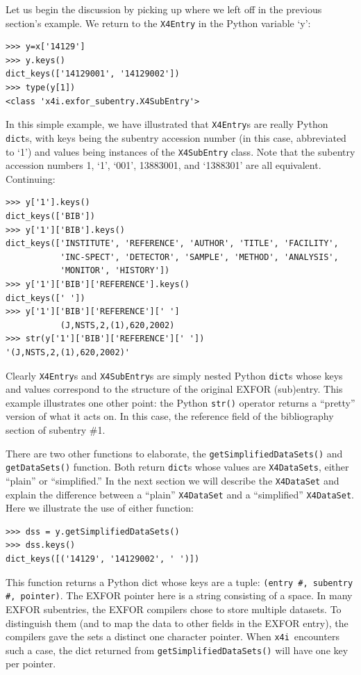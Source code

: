\documentclass[11pt]{article}
\newcommand{\xfouri}{\texttt{x4i}}
\begin{document}
Let us begin the discussion by picking up where we left off in the previous section's example.  We return to the \texttt{X4Entry} in the Python variable `y':
\begin{verbatim}
>>> y=x['14129']
>>> y.keys()
dict_keys(['14129001', '14129002'])
>>> type(y[1])
<class 'x4i.exfor_subentry.X4SubEntry'>
\end{verbatim}
In this simple example, we have illustrated that \texttt{X4Entry}s are really Python \texttt{dict}s, with keys  being the subentry accession number (in this case, abbreviated to `1') and values being instances of the \texttt{X4SubEntry} class.  Note that the subentry accession numbers 1, `1', `001', 13883001, and `1388301' are all equivalent.   Continuing:
\begin{verbatim}
>>> y['1'].keys()
dict_keys(['BIB'])
>>> y['1']['BIB'].keys()
dict_keys(['INSTITUTE', 'REFERENCE', 'AUTHOR', 'TITLE', 'FACILITY',
           'INC-SPECT', 'DETECTOR', 'SAMPLE', 'METHOD', 'ANALYSIS',
           'MONITOR', 'HISTORY'])
>>> y['1']['BIB']['REFERENCE'].keys()
dict_keys([' '])
>>> y['1']['BIB']['REFERENCE'][' ']
           (J,NSTS,2,(1),620,2002)
>>> str(y['1']['BIB']['REFERENCE'][' '])
'(J,NSTS,2,(1),620,2002)'
\end{verbatim}
Clearly \texttt{X4Entry}s and \texttt{X4SubEntry}s are simply nested Python \texttt{dict}s whose keys and values  correspond to the structure of the original EXFOR (sub)entry.  This example illustrates one other point:  the Python \texttt{str()} operator returns a ``pretty'' version of what it acts on.  In this case, the reference field of the bibliography section of subentry \#1.

There are two other functions to elaborate, the \texttt{getSimplifiedDataSets()} and \texttt{getDataSets()} function.  Both return \texttt{dict}s whose values are \texttt{X4DataSets}, either ``plain'' or ``simplified.''  In the next section we will describe the \texttt{X4DataSet} and explain the difference between a ``plain'' \texttt{X4DataSet} and a ``simplified'' \texttt{X4DataSet}.  Here we illustrate the use of either function:
\begin{verbatim}
>>> dss = y.getSimplifiedDataSets()
>>> dss.keys()
dict_keys([('14129', '14129002', ' ')])
\end{verbatim}
This function returns a Python dict whose keys are a tuple:  \texttt{(entry \#, subentry \#, pointer)}.  The EXFOR pointer here is a string consisting of a space.  In many EXFOR subentries, the EXFOR compilers chose to store multiple datasets.  To distinguish them (and to map the data  to other fields in the EXFOR entry), the compilers gave the sets a distinct one character pointer.  When \xfouri\ encounters such a case, the dict returned from \texttt{getSimplifiedDataSets()} will have one key per pointer.
\end{document}
